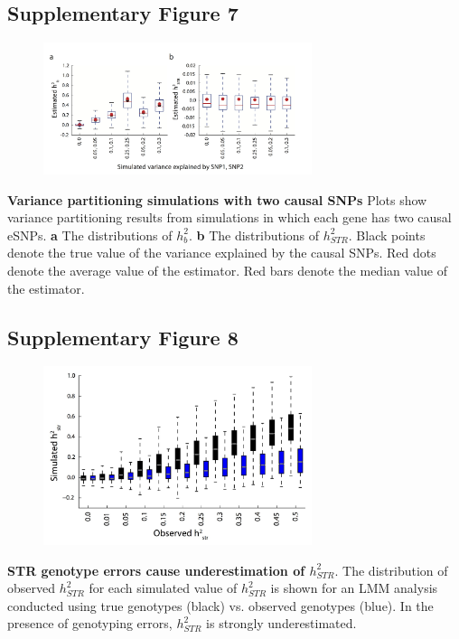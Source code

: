 \subsection{Supplementary Figure 7}
\begin{figure}[h!]
\centering
\label{fig:estrsupfig7}
\includegraphics[width=0.7\textwidth]{Figures/Chapter4/SuppFig7.jpg}
\end{figure}
\textbf{Variance partitioning simulations with two causal SNPs} Plots show variance partitioning results from simulations in which each gene has two causal eSNPs. \textbf{a} The distributions of $h^2_{b}$. \textbf{b} The distributions of $h^2_{STR}$. Black points denote the true value of the variance explained by the causal SNPs. 
Red dots denote the average value of the estimator.
Red bars denote the median value of the estimator.

\pagebreak
\subsection{Supplementary Figure 8}
\begin{figure}[h!]
\centering
\label{fig:estrsupfig8}
\includegraphics[width=0.7\textwidth]{Figures/Chapter4/SuppFig8.jpg}
\end{figure}

\textbf{STR genotype errors cause underestimation of $h^2_{STR}$}. The distribution of observed $h^2_{STR}$ for each simulated value of $h^2_{STR}$ is shown for an LMM analysis conducted using true genotypes (black) vs. observed genotypes (blue). In the presence of genotyping errors, $h^2_{STR}$ is strongly underestimated.

